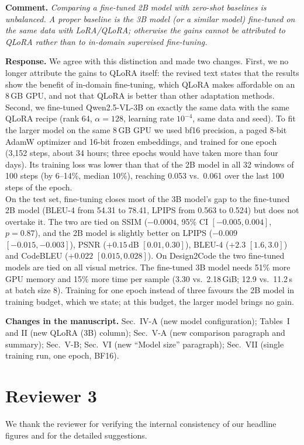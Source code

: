 \documentclass[11pt,a4paper]{article}
\newcommand{\rev}[1]{\par\noindent\textbf{Comment.} \textit{#1}\par}
\newcommand{\resp}{\par\noindent\textbf{Response.} }
\newcommand{\change}[1]{\par\noindent\textbf{Changes in the manuscript.} #1\par\medskip}
\begin{document}
\rev{Comparing a fine-tuned 2B model with zero-shot baselines is unbalanced. A
proper baseline is the 3B model (or a similar model) fine-tuned on the same data
with LoRA/QLoRA; otherwise the gains cannot be attributed to QLoRA rather than to
in-domain supervised fine-tuning.}
\resp We agree with this distinction and made two changes. First, we no longer
attribute the gains to QLoRA itself: the revised text states that the results show
the benefit of in-domain fine-tuning, which QLoRA makes affordable on an 8\,GB
GPU, and not that QLoRA is better than other adaptation methods. Second, we
fine-tuned Qwen2.5-VL-3B on exactly the same data with the same QLoRA recipe
(rank 64, $\alpha=128$, learning rate $10^{-4}$, same data and seed). To fit the
larger model on the same 8\,GB GPU we used bf16 precision, a paged 8-bit AdamW
optimizer and 16-bit frozen embeddings, and trained for one epoch (3,152 steps,
about 34 hours; three epochs would have taken more than four days). Its training loss was lower than
that of the 2B model in all 32 windows of 100 steps (by 6--14\%, median 10\%),
reaching 0.053 vs.\ 0.061 over the last 100 steps of the epoch.\\
On the test set, fine-tuning closes most of the 3B model's gap to the fine-tuned
2B model (BLEU-4 from 54.31 to 78.41, LPIPS from 0.563 to 0.524) but does not
overtake it. The two are tied on SSIM ($-0.0004$, 95\% CI $[-0.005, 0.004]$,
$p=0.87$), and the 2B model is slightly better on LPIPS ($-0.009$
$[-0.015, -0.003]$), PSNR ($+0.15$\,dB $[0.01, 0.30]$), BLEU-4 ($+2.3$
$[1.6, 3.0]$) and CodeBLEU ($+0.022$ $[0.015, 0.028]$). On Design2Code the two
fine-tuned models are tied on all visual metrics. The fine-tuned 3B model needs
51\% more GPU memory and 15\% more time per sample (3.30 vs.\ 2.18\,GiB; 12.9 vs.\
11.2\,s at batch size 8). Training for one epoch instead of three favours the 2B
model in training budget, which we state; at this budget, the larger model brings
no gain.
\change{Sec.~IV-A (new model configuration); Tables~I and II (new QLoRA (3B)
column); Sec.~V-A (new comparison paragraph and summary); Sec.~V-B; Sec.~VI
(new ``Model size'' paragraph); Sec.~VII (single training run, one epoch, BF16).}

\section*{Reviewer 3}

We thank the reviewer for verifying the internal consistency of our headline
figures and for the detailed suggestions.
\end{document}
